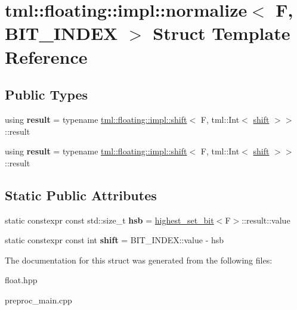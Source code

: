 \hypertarget{structtml_1_1floating_1_1impl_1_1normalize}{\section{tml\+:\+:floating\+:\+:impl\+:\+:normalize$<$ F, B\+I\+T\+\_\+\+I\+N\+D\+E\+X $>$ Struct Template Reference}
\label{structtml_1_1floating_1_1impl_1_1normalize}
}
\subsection*{Public Types}
\begin{DoxyCompactItemize}
\item 
\hypertarget{structtml_1_1floating_1_1impl_1_1normalize_ad893c56f1e4177ab640922a923d84d85}{using {\bfseries result} = typename \hyperlink{structtml_1_1floating_1_1impl_1_1shift}{tml\+::floating\+::impl\+::shift}$<$ F, tml\+::\+Int$<$ \hyperlink{structtml_1_1floating_1_1impl_1_1shift}{shift} $>$$>$\+::result}\label{structtml_1_1floating_1_1impl_1_1normalize_ad893c56f1e4177ab640922a923d84d85}

\item 
\hypertarget{structtml_1_1floating_1_1impl_1_1normalize_ad893c56f1e4177ab640922a923d84d85}{using {\bfseries result} = typename \hyperlink{structtml_1_1floating_1_1impl_1_1shift}{tml\+::floating\+::impl\+::shift}$<$ F, tml\+::\+Int$<$ \hyperlink{structtml_1_1floating_1_1impl_1_1shift}{shift} $>$$>$\+::result}\label{structtml_1_1floating_1_1impl_1_1normalize_ad893c56f1e4177ab640922a923d84d85}

\end{DoxyCompactItemize}
\subsection*{Static Public Attributes}
\begin{DoxyCompactItemize}
\item 
\hypertarget{structtml_1_1floating_1_1impl_1_1normalize_a8f6246893698ad2f1956640883219843}{static constexpr const std\+::size\+\_\+t {\bfseries hsb} = \hyperlink{structtml_1_1floating_1_1impl_1_1highest__set__bit}{highest\+\_\+set\+\_\+bit}$<$F$>$\+::result\+::value}\label{structtml_1_1floating_1_1impl_1_1normalize_a8f6246893698ad2f1956640883219843}

\item 
\hypertarget{structtml_1_1floating_1_1impl_1_1normalize_a77b00cb0e2ff18b84c1dc247c36ad437}{static constexpr const int {\bfseries shift} = B\+I\+T\+\_\+\+I\+N\+D\+E\+X\+::value -\/ hsb}\label{structtml_1_1floating_1_1impl_1_1normalize_a77b00cb0e2ff18b84c1dc247c36ad437}

\end{DoxyCompactItemize}


The documentation for this struct was generated from the following files\+:\begin{DoxyCompactItemize}
\item 
float.\+hpp\item 
preproc\+\_\+main.\+cpp\end{DoxyCompactItemize}
